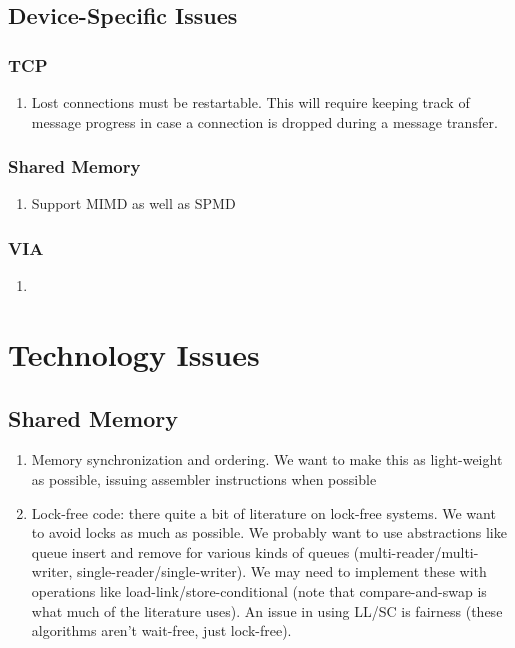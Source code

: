 \documentclass{article}
\begin{document}
\subsection{Device-Specific Issues}

\subsubsection{TCP}
\begin{enumerate}
\item Lost connections must be restartable.  This will require keeping track
  of message progress in case a connection is dropped during a message
  transfer. 
\end{enumerate}

\subsubsection{Shared Memory}
\begin{enumerate}
\item Support MIMD as well as SPMD
\end{enumerate}

\subsubsection{VIA}
\begin{enumerate}
\item 
\end{enumerate}

\section{Technology Issues}

\subsection{Shared Memory}
\begin{enumerate}
\item Memory synchronization and ordering.  We want to make this as
  light-weight as possible, issuing assembler instructions when possible
\item Lock-free code: there quite a bit of literature on lock-free systems.
  We want to avoid locks as much as possible.  We probably want to use
  abstractions like queue insert and remove for various kinds of queues
  (multi-reader/multi-writer, single-reader/single-writer).  We may need to
  implement these with operations like load-link/store-conditional (note that
  compare-and-swap is what much of the literature uses).  An issue in using
  LL/SC is fairness (these algorithms aren't wait-free, just lock-free).
\end{enumerate}
\end{document}
